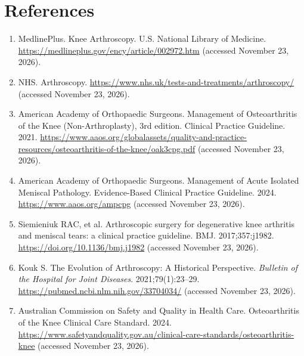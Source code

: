 \section*{References}
\begin{enumerate}
  \item MedlinePlus. Knee Arthroscopy. U.S. National Library of Medicine. \url{https://medlineplus.gov/ency/article/002972.htm} (accessed November 23, 2026).
  \item NHS. Arthroscopy. \url{https://www.nhs.uk/tests-and-treatments/arthroscopy/} (accessed November 23, 2026).
  \item American Academy of Orthopaedic Surgeons. Management of Osteoarthritis of the Knee (Non-Arthroplasty), 3rd edition. Clinical Practice Guideline. 2021. \url{https://www.aaos.org/globalassets/quality-and-practice-resources/osteoarthritis-of-the-knee/oak3cpg.pdf} (accessed November 23, 2026).
  \item American Academy of Orthopaedic Surgeons. Management of Acute Isolated Meniscal Pathology. Evidence-Based Clinical Practice Guideline. 2024. \url{https://www.aaos.org/ampcpg} (accessed November 23, 2026).
  \item Siemieniuk RAC, et al. Arthroscopic surgery for degenerative knee arthritis and meniscal tears: a clinical practice guideline. BMJ. 2017;357:j1982. \url{https://doi.org/10.1136/bmj.j1982} (accessed November 23, 2026).
  \item Kouk S. The Evolution of Arthroscopy: A Historical Perspective. \textit{Bulletin of the Hospital for Joint Diseases}. 2021;79(1):23--29. \url{https://pubmed.ncbi.nlm.nih.gov/33704034/} (accessed November 23, 2026).
  \item Australian Commission on Safety and Quality in Health Care. Osteoarthritis of the Knee Clinical Care Standard. 2024. \url{https://www.safetyandquality.gov.au/clinical-care-standards/osteoarthritis-knee} (accessed November 23, 2026).
\end{enumerate}

\clearpage
